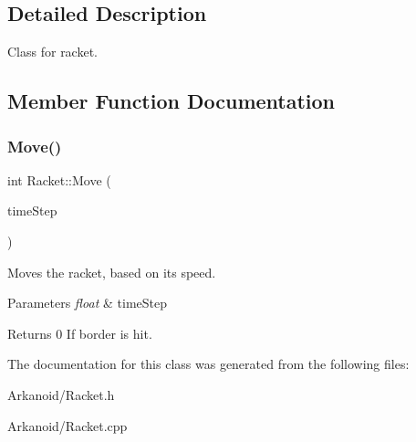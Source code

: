 \subsection{Detailed Description}
Class for racket. 

\subsection{Member Function Documentation}
\mbox{\label{class_racket_aed265c7633d22165e3ad30b4dfa6c7f8}} 
\subsubsection{\texorpdfstring{Move()}{Move()}}
{\footnotesize\ttfamily int Racket\+::\+Move (\begin{DoxyParamCaption}\item[{float}]{time\+Step }\end{DoxyParamCaption})}



Moves the racket, based on its speed. 


\begin{DoxyParams}{Parameters}
{\em float} & time\+Step\\
\hline
\end{DoxyParams}
\begin{DoxyReturn}{Returns}
0 If border is hit. 
\end{DoxyReturn}


The documentation for this class was generated from the following files\+:\begin{DoxyCompactItemize}
\item 
Arkanoid/Racket.\+h\item 
Arkanoid/Racket.\+cpp\end{DoxyCompactItemize}
